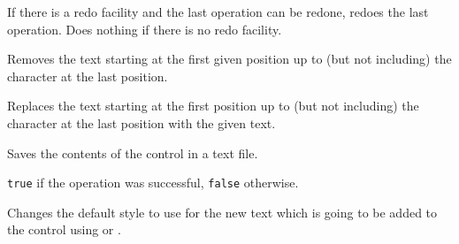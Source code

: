 
If there is a redo facility and the last operation can be redone, redoes the last operation. Does nothing
if there is no redo facility.


\label{wxtextctrlremove}


Removes the text starting at the first given position up to (but not including)
the character at the last position.





\label{wxtextctrlreplace}


Replaces the text starting at the first position up to (but not including)
the character at the last position with the given text.






\label{wxtextctrlsavefile}


Saves the contents of the control in a text file.




{\tt true} if the operation was successful, {\tt false} otherwise.


\label{wxtextctrlsetdefaultstyle}


Changes the default style to use for the new text which is going to be added
to the control using  or\rtfsp
{}.

